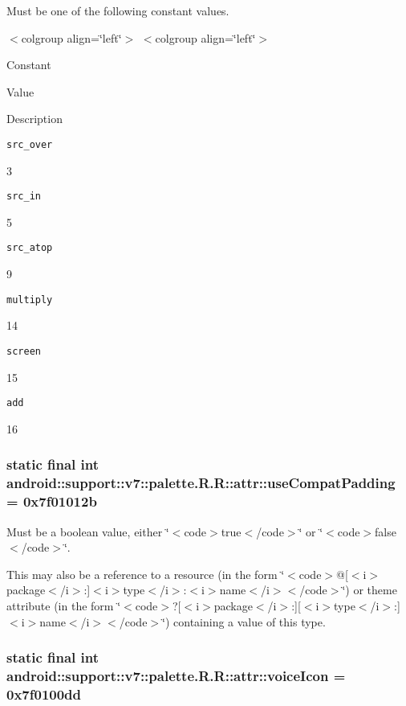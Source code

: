 Must be one of the following constant values. \begin{TabularC}{0}
\hline
\end{TabularC}
$<$colgroup align=\char`\"{}left\char`\"{}$>$ $<$colgroup align=\char`\"{}left\char`\"{}$>$ 

Constant

Value

Description 

{\tt src\_\-over}

3

{\tt src\_\-in}

5

{\tt src\_\-atop}

9

{\tt multiply}

14

{\tt screen}

15

{\tt add}

16\hypertarget{classandroid_1_1support_1_1v7_1_1palette_1_1_r_1_1attr_bf42b17fb41687813f482b5813488a72}{
\subsubsection[{useCompatPadding}]{\setlength{\rightskip}{0pt plus 5cm}static final int android::support::v7::palette.R.R::attr::useCompatPadding = 0x7f01012b}}
\label{classandroid_1_1support_1_1v7_1_1palette_1_1_r_1_1attr_bf42b17fb41687813f482b5813488a72}


Must be a boolean value, either \char`\"{}$<$code$>$true$<$/code$>$\char`\"{} or \char`\"{}$<$code$>$false$<$/code$>$\char`\"{}. 

This may also be a reference to a resource (in the form \char`\"{}$<$code$>$@\mbox{[}$<$i$>$package$<$/i$>$:\mbox{]}$<$i$>$type$<$/i$>$:$<$i$>$name$<$/i$>$$<$/code$>$\char`\"{}) or theme attribute (in the form \char`\"{}$<$code$>$?\mbox{[}$<$i$>$package$<$/i$>$:\mbox{]}\mbox{[}$<$i$>$type$<$/i$>$:\mbox{]}$<$i$>$name$<$/i$>$$<$/code$>$\char`\"{}) containing a value of this type. \hypertarget{classandroid_1_1support_1_1v7_1_1palette_1_1_r_1_1attr_28aec8d667bd248f8b030403f2b6384d}{
\subsubsection[{voiceIcon}]{\setlength{\rightskip}{0pt plus 5cm}static final int android::support::v7::palette.R.R::attr::voiceIcon = 0x7f0100dd}}
\label{classandroid_1_1support_1_1v7_1_1palette_1_1_r_1_1attr_28aec8d667bd248f8b030403f2b6384d}



